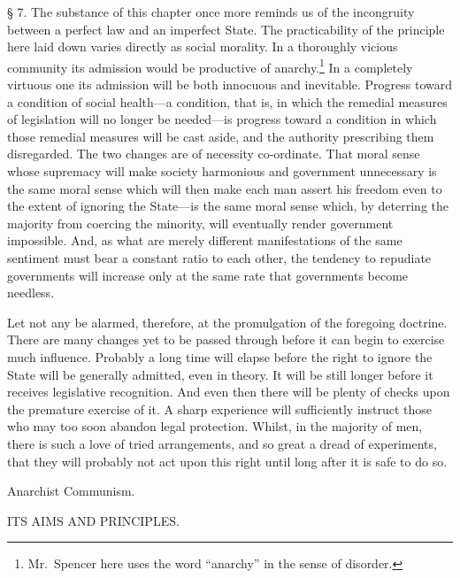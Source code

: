 \documentclass[oneside]{book}
\begin{document}
\S{} 7. The substance of this chapter once more reminds us
of the incongruity between a perfect law and an imperfect State.
The practicability of the principle here laid down varies directly
as social morality. In a thoroughly vicious community its
admission would be productive of anarchy.\footnote{Mr.\
Spencer here uses the word ``anarchy'' in the sense of disorder.}
In a completely
virtuous one its admission will be both innocuous and inevitable.
Progress toward a condition of social health---a condition, that
\newpage\noindent
is, in which the remedial measures of legislation will no longer
be needed---is progress toward a condition in which those
remedial measures will be cast aside, and the authority prescribing
them disregarded. The two changes are of necessity
co-ordinate. That moral sense whose supremacy will make
society harmonious and government unnecessary is the same
moral sense which will then make each man assert his freedom
even to the extent of ignoring the State---is the same moral
sense which, by deterring the majority from coercing the
minority, will eventually render government impossible. And,
as what are merely different manifestations of the same sentiment
must bear a constant ratio to each other, the tendency
to repudiate governments will increase only at the same rate
that governments become needless.

Let not any be alarmed, therefore, at the promulgation of
the foregoing doctrine. There are many changes yet to be
passed through before it can begin to exercise much influence.
Probably a long time will elapse before the right to ignore
the State will be generally admitted, even in theory. It will
be still longer before it receives legislative recognition. And
even then there will be plenty of checks upon the premature
exercise of it. A sharp experience will sufficiently instruct
those who may too soon abandon legal protection. Whilst, in
the majority of men, there is such a love of tried arrangements,
and so great a dread of experiments, that they will probably
not act upon this right until long after it is safe to do so.

\newpage




\begin{center}{\LARGE Anarchist Communism.\footnotemark}\end{center}

\begin{center}{ITS AIMS AND PRINCIPLES.}\end{center}
\end{document}
